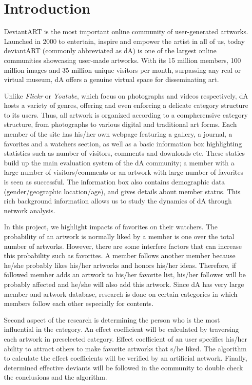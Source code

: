 \documentclass[12pt,a4paper]{report}
\begin{document}
\tableofcontents

\chapter{Introduction}

	DeviantART is the most important online community of user-generated artworks. Launched in 2000 to entertain, inspire and empower the artist in all of us, today deviantART (commonly abbreviated as dA) is one of the largest online communities showcasing user-made artworks. With its 15 million members, 100 million images and 35 million unique visitors per month, surpassing any real or virtual museum, dA offers a genuine virtual space for disseminating art.

	Unlike \emph{Flickr} or \emph{Youtube}, which focus on photographs and videos respectively, dA hosts a variety of genres, offering and even enforcing a delicate category structure to its users. Thus, all artwork is organized according to a compherensive category structure, from photographs to various digital and traditional art forms. Each member of the site has his/her own webpage featuring a gallery, a journal, a favorites and a watchers section, as well as a basic information box highlighting statistics such as number of visitors, comments and downloads etc. These statics build up the main evaluation system of the dA community; a member with a large number of visitors/comments or an artwork with large number of favorites is seen as successful. The information box also contains demographic data (gender/geographic location/age), and gives details about member status. This rich background information allows us to study the dynamics of dA through network analysis.

           In this project, we highlight impacts of favorites on their watchers. The probability of an artwork is normally liked by a member is one over the total number of artworks. However, there are some interfere factors that can increase this probability such as favorites. A member follows another member because he/she probably likes his/her artworks and honors his/her ideas. Therefore, if followed member adds an artwork to his/her favorite list, his/her follower will be probably affected and he/she will also add this artwork. Since dA has very large member and artwork database, research is done on certain categories in which members follow each other especially for contents.

	 Second aspect of the research is determining the person who is the most influential in the category. An effect coefficient will be calculated by traversing each artwork in preselected category. Effect coefficient of an user specifies  his/her ability to attract others to make favorite artworks that s/he liked. The algorithm to calculate the effect coefficients will be verified by an artificial network. Finally, determined effective deviants will be followed in the community to double check the conclusions and the algorithm. 
\end{document}
